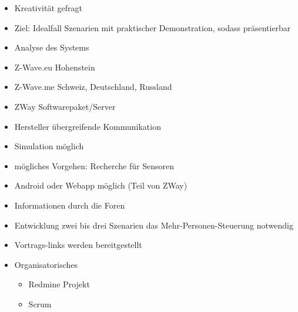 \begin{itemize}
	\item Kreativität gefragt
	\item Ziel: Idealfall Szenarien mit praktischer Demonstration, sodass präsentierbar
	\item Analyse des Systems
	\item Z-Wave.eu \textrightarrow Hohenstein
	\item Z-Wave.me \textrightarrow Schweiz, Deutschland, Russland
	\item ZWay \textrightarrow Softwarepaket/Server
	\item Hersteller übergreifende Kommunikation
	\item Simulation möglich
	\item mögliches Vorgehen: Recherche für Sensoren
	\item Android oder Webapp möglich (Teil von ZWay)
	\item Informationen durch die Foren
	\item Entwicklung zwei bis drei Szenarien das Mehr-Personen-Steuerung notwendig
	\item Vortrags-links werden bereitgestellt
	\item Organisatorisches
	\begin{itemize}
		\item Redmine Projekt
		\item Scrum
	\end{itemize}
\end{itemize}

